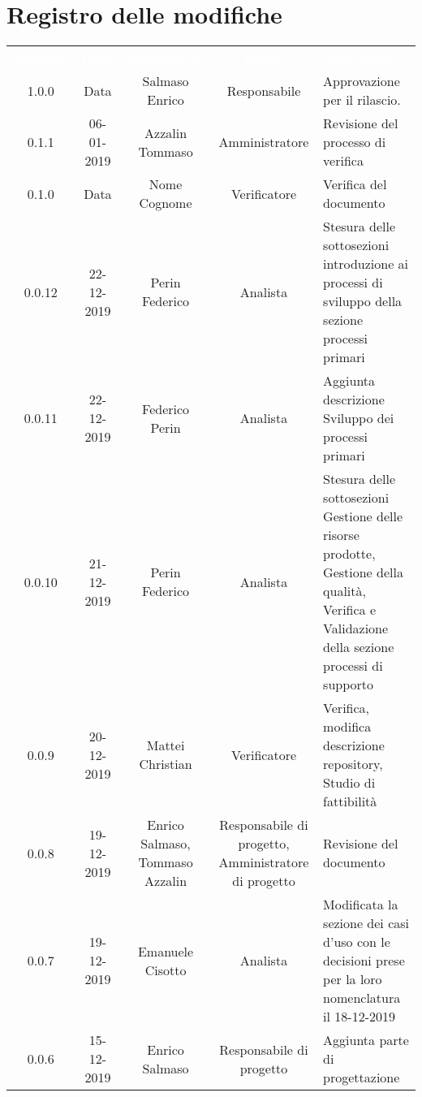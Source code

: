 \section*{Registro delle modifiche}
{
\renewcommand{\arraystretch}{1.5}
\centering
\begin{longtable}{ c c  c  c C{4cm}}
\textcolor{white}{\textbf{Versione}} & \textcolor{white}{\textbf{Data}} & \textcolor{white}{\textbf{Nominativo}} & \textcolor{white}{\textbf{Ruolo}} & \textcolor{white}{\textbf{Descrizione}}\\	


1.0.0 & Data & Salmaso Enrico & Responsabile & Approvazione per il rilascio.  \\

0.1.1 & 06-01-2019 & Azzalin Tommaso & Amministratore & Revisione del processo di verifica \\

0.1.0 & Data & Nome Cognome & Verificatore & Verifica del documento \\

0.0.12 & 22-12-2019 & Perin Federico & Analista & Stesura delle sottosezioni introduzione ai processi di sviluppo della sezione processi primari\\

0.0.11 & 22-12-2019 & Federico Perin & Analista & Aggiunta descrizione Sviluppo dei processi primari \\

0.0.10 & 21-12-2019 & Perin Federico & Analista & Stesura delle sottosezioni Gestione delle risorse prodotte, Gestione della qualità, Verifica e Validazione della sezione processi di supporto \\

0.0.9 & 20-12-2019 & Mattei Christian & Verificatore & Verifica, modifica descrizione repository, Studio di fattibilità \\

0.0.8 & 19-12-2019 & Enrico Salmaso, Tommaso Azzalin & Responsabile di progetto, Amministratore di progetto & Revisione del documento \\

0.0.7 & 19-12-2019 & Emanuele Cisotto & Analista & Modificata la sezione dei casi d’uso con le decisioni prese per la loro nomenclatura il 18-12-2019 \\

0.0.6 & 15-12-2019 & Enrico Salmaso & Responsabile di progetto & Aggiunta parte di progettazione \\


\end{longtable}}
